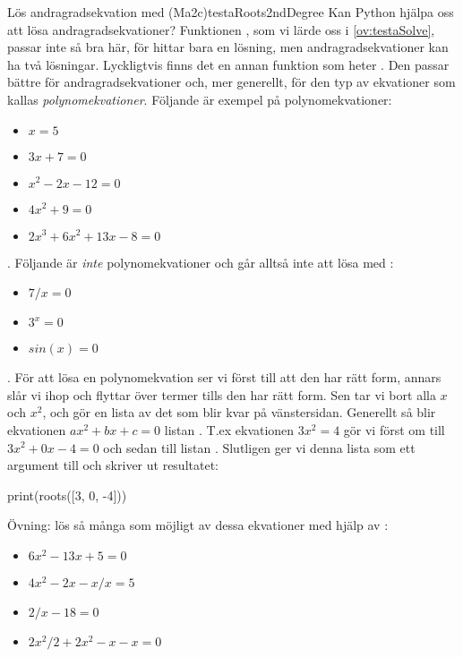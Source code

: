 \begin{matteovning}{Lös andragradsekvation med  (Ma2c)}{testaRoots2ndDegree}
Kan Python hjälpa oss att lösa andragradsekvationer? Funktionen , som vi lärde oss i \autoref{ov:testaSolve}, passar inte så bra här, för  hittar bara en lösning, men andragradsekvationer kan ha två lösningar. Lyckligtvis finns det en annan funktion som heter . Den passar bättre för andragradsekvationer och, mer generellt, för den typ av ekvationer som kallas \emph{polynomekvationer}. Följande är exempel på polynomekvationer:

\begin{itemize}
\item $x = 5$
\item $3x + 7 = 0$
\item $x^2 - 2x - 12 = 0$
\item $4x^2 + 9 = 0$
\item $2x^3 + 6x^2 + 13x - 8 = 0$
\end{itemize}

{\color{white}.}
\newline
Följande är \emph{inte} polynomekvationer och går alltså inte att lösa med :
\begin{itemize}
\item $7 / x = 0$
\item $3^x = 0$
\item $sin(x) = 0$
\end{itemize}

{\color{white}.}
\newline
För att lösa en polynomekvation ser vi först till att den har rätt form, annars slår vi ihop och flyttar över termer tills den har rätt form. Sen tar vi bort alla $x$ och $x^2$, och gör en lista av det som blir kvar på vänstersidan. Generellt så blir ekvationen $ax^2 + bx + c = 0$ listan \cw{[a, b, c]}. T.ex ekvationen $3x^2 = 4$ gör vi först om till $3x^2 + 0x - 4 = 0$ och sedan till listan \cw{[3, 0, -4]}. Slutligen ger vi denna lista som ett argument till  och skriver ut resultatet:
\vspace{10pt}
\begin{python}
print(roots([3, 0, -4]))
\end{python}

Övning: lös så många som möjligt av dessa ekvationer med hjälp av :
\begin{itemize}
\item $6x^2 - 13x + 5 = 0$ %
\item $4x^2 - 2x - x/x = 5$ %
\item $2/x - 18 = 0$ %
\item $2x^2 / 2 + 2x^2 - x - x = 0$ %
\end{itemize}
\end{matteovning}

